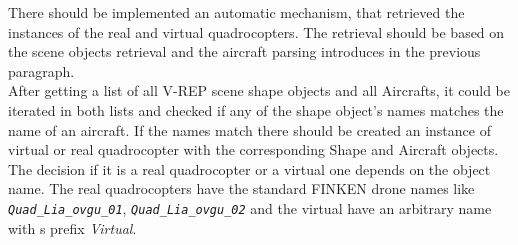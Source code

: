 There should be implemented an automatic mechanism, that retrieved the instances of the real and virtual quadrocopters. The retrieval should be based on the scene objects retrieval and the aircraft parsing introduces in the previous paragraph. \\
After getting a list of all V-REP scene shape objects and all Aircrafts, it could be iterated in both lists and checked if any of the shape object's names matches the name of an aircraft. If the names match there should be created an instance of virtual or real quadrocopter with the corresponding Shape and Aircraft objects.
The decision if it is a real quadrocopter or a virtual one depends on the object name. The real quadrocopters have the standard FINKEN drone names like \textit{\texttt{Quad\_Lia\_ovgu\_01}}, \textit{\texttt{Quad\_Lia\_ovgu\_02}} and the virtual have an arbitrary name with s prefix \textit{Virtual}.

 

  

